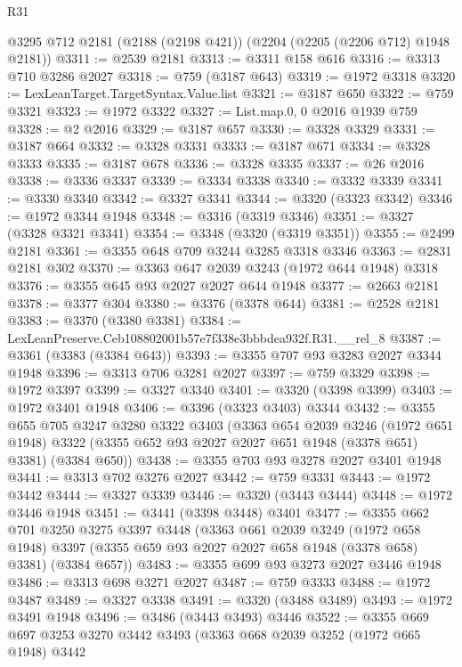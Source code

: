 \begin{lexlean}{R31}
\begin{coremodule}
    @3295
    @712
    @2181
    (@2188 (@2198 @421))
    (@2204 (@2205 (@2206 @712) @1948 @2181))
@3311 := @2539 @2181
@3313 := @3311 @158 @616
@3316 := @3313 @710 @3286 @2027
@3318 := @759 (@3187 @643)
@3319 := @1972 @3318
@3320 := LexLeanTarget.TargetSyntax.Value.list
@3321 := @3187 @650
@3322 := @759 @3321
@3323 := @1972 @3322
@3327 := List.map.{0, 0} @2016 @1939 @759
@3328 := @2 @2016
@3329 := @3187 @657
@3330 := @3328 @3329
@3331 := @3187 @664
@3332 := @3328 @3331
@3333 := @3187 @671
@3334 := @3328 @3333
@3335 := @3187 @678
@3336 := @3328 @3335
@3337 := @26 @2016
@3338 := @3336 @3337
@3339 := @3334 @3338
@3340 := @3332 @3339
@3341 := @3330 @3340
@3342 := @3327 @3341
@3344 := @3320 (@3323 @3342)
@3346 := @1972 @3344 @1948
@3348 := @3316 (@3319 @3346)
@3351 := @3327 (@3328 @3321 @3341)
@3354 := @3348 (@3320 (@3319 @3351))
@3355 := @2499 @2181
@3361 := @3355 @648 @709 @3244 @3285 @3318 @3346
@3363 := @2831 @2181 @302
@3370 := @3363 @647 @2039 @3243 (@1972 @644 @1948) @3318
@3376 := @3355 @645 @93 @2027 @2027 @644 @1948
@3377 := @2663 @2181
@3378 := @3377 @304
@3380 := @3376 (@3378 @644)
@3381 := @2528 @2181
@3383 := @3370 (@3380 @3381)
@3384 := LexLeanPreserve.Ceb108802001b57e7f338e3bbbdea932f.R31.__rel_8
@3387 := @3361 (@3383 (@3384 @643))
@3393 := @3355 @707 @93 @3283 @2027 @3344 @1948
@3396 := @3313 @706 @3281 @2027
@3397 := @759 @3329
@3398 := @1972 @3397
@3399 := @3327 @3340
@3401 := @3320 (@3398 @3399)
@3403 := @1972 @3401 @1948
@3406 := @3396 (@3323 @3403) @3344
@3432 := @3355
    @655
    @705
    @3247
    @3280
    @3322
    @3403
    (@3363
      @654
      @2039
      @3246
      (@1972 @651 @1948)
      @3322
      (@3355 @652 @93 @2027 @2027 @651 @1948 (@3378 @651) @3381)
      (@3384 @650))
@3438 := @3355 @703 @93 @3278 @2027 @3401 @1948
@3441 := @3313 @702 @3276 @2027
@3442 := @759 @3331
@3443 := @1972 @3442
@3444 := @3327 @3339
@3446 := @3320 (@3443 @3444)
@3448 := @1972 @3446 @1948
@3451 := @3441 (@3398 @3448) @3401
@3477 := @3355
    @662
    @701
    @3250
    @3275
    @3397
    @3448
    (@3363
      @661
      @2039
      @3249
      (@1972 @658 @1948)
      @3397
      (@3355 @659 @93 @2027 @2027 @658 @1948 (@3378 @658) @3381)
      (@3384 @657))
@3483 := @3355 @699 @93 @3273 @2027 @3446 @1948
@3486 := @3313 @698 @3271 @2027
@3487 := @759 @3333
@3488 := @1972 @3487
@3489 := @3327 @3338
@3491 := @3320 (@3488 @3489)
@3493 := @1972 @3491 @1948
@3496 := @3486 (@3443 @3493) @3446
@3522 := @3355
    @669
    @697
    @3253
    @3270
    @3442
    @3493
    (@3363
      @668
      @2039
      @3252
      (@1972 @665 @1948)
      @3442

\end{coremodule}
\end{lexlean}
